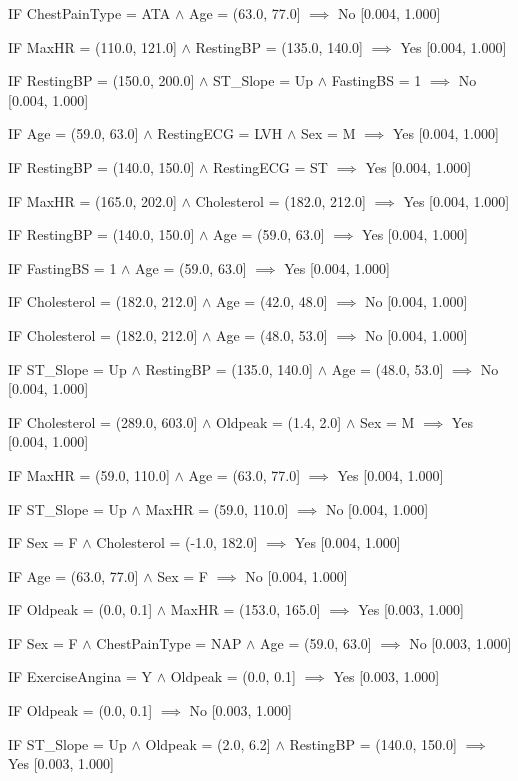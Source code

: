 IF ChestPainType = ATA $\land$ Age = (63.0, 77.0] $\implies$ No [0.004, 1.000]

IF MaxHR = (110.0, 121.0] $\land$ RestingBP = (135.0, 140.0] $\implies$ Yes [0.004, 1.000]

IF RestingBP = (150.0, 200.0] $\land$ ST\_Slope = Up $\land$ FastingBS = 1 $\implies$ No [0.004, 1.000]

IF Age = (59.0, 63.0] $\land$ RestingECG = LVH $\land$ Sex = M $\implies$ Yes [0.004, 1.000]

IF RestingBP = (140.0, 150.0] $\land$ RestingECG = ST $\implies$ Yes [0.004, 1.000]

IF MaxHR = (165.0, 202.0] $\land$ Cholesterol = (182.0, 212.0] $\implies$ Yes [0.004, 1.000]

IF RestingBP = (140.0, 150.0] $\land$ Age = (59.0, 63.0] $\implies$ Yes [0.004, 1.000]

IF FastingBS = 1 $\land$ Age = (59.0, 63.0] $\implies$ Yes [0.004, 1.000]

IF Cholesterol = (182.0, 212.0] $\land$ Age = (42.0, 48.0] $\implies$ No [0.004, 1.000]

IF Cholesterol = (182.0, 212.0] $\land$ Age = (48.0, 53.0] $\implies$ No [0.004, 1.000]

IF ST\_Slope = Up $\land$ RestingBP = (135.0, 140.0] $\land$ Age = (48.0, 53.0] $\implies$ No [0.004, 1.000]

IF Cholesterol = (289.0, 603.0] $\land$ Oldpeak = (1.4, 2.0] $\land$ Sex = M $\implies$ Yes [0.004, 1.000]

IF MaxHR = (59.0, 110.0] $\land$ Age = (63.0, 77.0] $\implies$ Yes [0.004, 1.000]

IF ST\_Slope = Up $\land$ MaxHR = (59.0, 110.0] $\implies$ No [0.004, 1.000]

IF Sex = F $\land$ Cholesterol = (-1.0, 182.0] $\implies$ Yes [0.004, 1.000]

IF Age = (63.0, 77.0] $\land$ Sex = F $\implies$ No [0.004, 1.000]

IF Oldpeak = (0.0, 0.1] $\land$ MaxHR = (153.0, 165.0] $\implies$ Yes [0.003, 1.000]

IF Sex = F $\land$ ChestPainType = NAP $\land$ Age = (59.0, 63.0] $\implies$ No [0.003, 1.000]

IF ExerciseAngina = Y $\land$ Oldpeak = (0.0, 0.1] $\implies$ Yes [0.003, 1.000]

IF Oldpeak = (0.0, 0.1] $\implies$ No [0.003, 1.000]

IF ST\_Slope = Up $\land$ Oldpeak = (2.0, 6.2] $\land$ RestingBP = (140.0, 150.0] $\implies$ Yes [0.003, 1.000]

